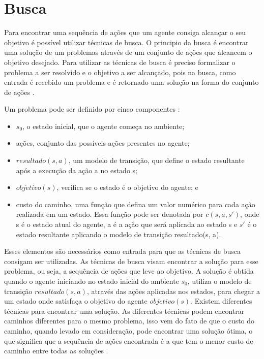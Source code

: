 \chapter{\label{chap:busca}Busca}

Para encontrar uma sequência de ações que um agente consiga alcançar o seu objetivo é possível utilizar técnicas de busca.
O principio da busca é encontrar uma solução de um problemas através de um conjunto de ações que alcancem o objetivo desejado. 
Para utilizar as técnicas de busca é preciso formalizar o problema a ser resolvido e o objetivo a ser alcançado, pois na busca, como entrada é recebido um problema e é retornado uma solução na forma do conjunto de ações \cite{intelligence2003modern}. 

Um problema pode ser definido por cinco componentes \cite{intelligence2003modern}: 

\begin{itemize}
	\item $s_{0}$, o estado inicial, que o agente começa no ambiente;
	\item ações, conjunto das possíveis ações presentes no agente;
	\item $resultado(s, a)$, um modelo de transição, que define o estado resultante após a execução da ação a no estado s;
	\item $objetivo(s)$, verifica se o estado é o objetivo do agente; e
	\item custo do caminho, uma função que defina um valor numérico para cada ação realizada em um estado. Essa função pode ser denotada por $c(s, a, s')$, onde s é o estado atual do agente, a é a ação que será aplicada ao estado s e $s'$ é o estado resultante aplicando o modelo de transição resultado(s, a). 
\end{itemize}   


Esses elementos são necessários como entrada para que as técnicas de busca consigam ser utilizadas. As técnicas de busca visam encontrar a solução para esse problema, ou seja, a sequência de ações que leve ao objetivo. 
A solução é obtida quando o agente iniciando no estado inicial do ambiente $s_{0}$, utiliza o modelo de transição $resultado(s, a)$, através das ações aplicadas nos estados, para chegar a um estado onde satisfaça o objetivo do agente $objetivo(s)$.
Existem diferentes técnicas para encontrar uma solução. As diferentes técnicas podem encontrar caminhos diferentes para o mesmo problema, isso vem do fato de que o custo do caminho, quando levado em consideração, pode encontrar uma solução ótima, o que significa que a sequência de ações encontrada é a que tem o menor custo de caminho entre todas as soluções \cite{intelligence2003modern}. 

